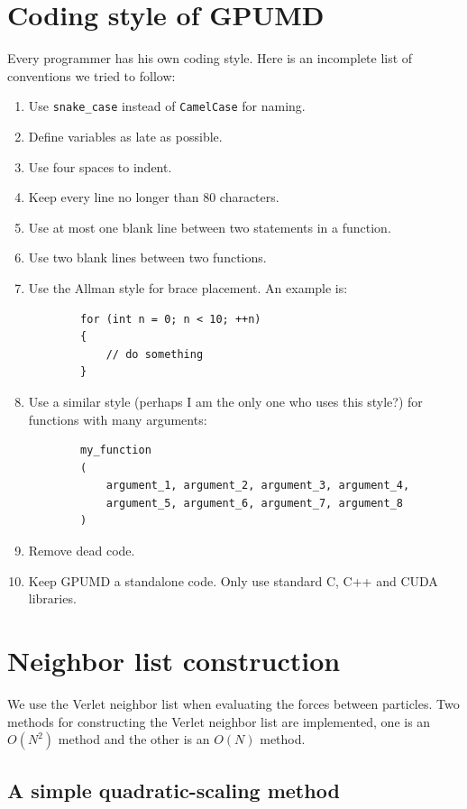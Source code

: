 \documentclass[12pt,a4paper]{report}
\begin{document}
\section{Coding style of GPUMD}

Every programmer has his own coding style. Here is an incomplete list of conventions we tried to follow:
\begin{enumerate}
\item Use \verb"snake_case" instead of \verb"CamelCase" for naming.
\item Define variables as late as possible.
\item Use four spaces to indent. 
\item Keep every line no longer than 80 characters.
\item Use at most one blank line between two statements in a function.
\item Use two blank lines between two functions.
\item Use the Allman style for brace placement. An example is:
    \begin{verbatim}
        for (int n = 0; n < 10; ++n) 
        {
            // do something
        }
    \end{verbatim}
\item Use a similar style (perhaps I am the only one who uses this style?) for functions with many arguments:
    \begin{verbatim}
        my_function
        (
            argument_1, argument_2, argument_3, argument_4, 
            argument_5, argument_6, argument_7, argument_8
        )
    \end{verbatim}
\item Remove dead code.
\item Keep GPUMD a standalone code. Only use standard C, C++ and CUDA libraries.
\end{enumerate}


\section{Neighbor list construction}


We use the Verlet neighbor list when evaluating the forces between particles. Two methods for constructing the Verlet neighbor list are implemented, one is an $O(N^2)$ method and the other is an $O(N)$ method.


\subsection{A simple quadratic-scaling method}
\end{document}

